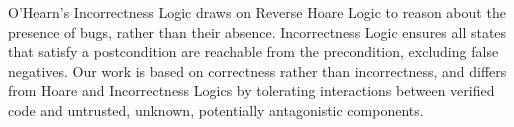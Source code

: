 
O'Hearn's Incorrectness Logic
\cite{IncorrectnessLogic}
draws on
Reverse Hoare Logic \cite{reverseHoare}
to reason about the presence of bugs, rather than their absence.
Incorrectness Logic ensures all states that satisfy a
postcondition are reachable from the precondition,
excluding false negatives.
%
Our work is based on correctness rather than incorrectness,
and 
differs from Hoare and Incorrectness Logics
by tolerating interactions between verified code and
untrusted, unknown, potentially antagonistic components.




%






